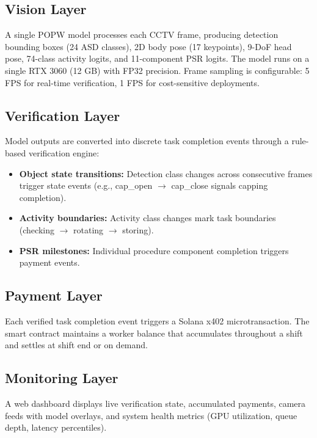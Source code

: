 \documentclass[10pt,twocolumn]{article}
\newcommand{\popw}{POPW}
\begin{document}
\subsection{Vision Layer}

A single \popw{} model processes each CCTV frame, producing detection bounding boxes (24 ASD classes), 2D body pose (17 keypoints), 9-DoF head pose, 74-class activity logits, and 11-component PSR logits. The model runs on a single RTX 3060 (12 GB) with FP32 precision. Frame sampling is configurable: 5 FPS for real-time verification, 1 FPS for cost-sensitive deployments.

\subsection{Verification Layer}

Model outputs are converted into discrete task completion events through a rule-based verification engine:
\begin{itemize}[nosep]
\item \textbf{Object state transitions:} Detection class changes across consecutive frames trigger state events (e.g., cap\_open $\rightarrow$ cap\_close signals capping completion).
\item \textbf{Activity boundaries:} Activity class changes mark task boundaries (checking $\rightarrow$ rotating $\rightarrow$ storing).
\item \textbf{PSR milestones:} Individual procedure component completion triggers payment events.
\end{itemize}

\subsection{Payment Layer}

Each verified task completion event triggers a Solana x402 microtransaction. The smart contract maintains a worker balance that accumulates throughout a shift and settles at shift end or on demand.

\subsection{Monitoring Layer}

A web dashboard displays live verification state, accumulated payments, camera feeds with model overlays, and system health metrics (GPU utilization, queue depth, latency percentiles).
\end{document}
